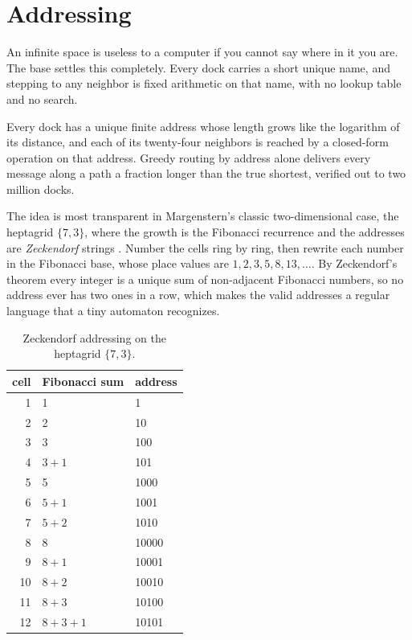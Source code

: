 \section{Addressing}

An infinite space is useless to a computer if you cannot say where in it you are. The base settles this completely. Every dock carries a short unique name, and stepping to any neighbor is fixed arithmetic on that name, with no lookup table and no search.

\begin{result}
Every dock has a unique finite address whose length grows like the logarithm of its distance, and each of its twenty-four neighbors is reached by a closed-form operation on that address. Greedy routing by address alone delivers every message along a path a fraction longer than the true shortest, verified out to two million docks. \cite{pollard2026vibetest}
\end{result}

The idea is most transparent in Margenstern's classic two-dimensional case, the heptagrid $\{7,3\}$, where the growth is the Fibonacci recurrence and the addresses are \emph{Zeckendorf} strings \cite{margenstern2008, margenstern2013}. Number the cells ring by ring, then rewrite each number in the Fibonacci base, whose place values are $1, 2, 3, 5, 8, 13, \ldots$. By Zeckendorf's theorem every integer is a unique sum of non-adjacent Fibonacci numbers, so no address ever has two ones in a row, which makes the valid addresses a regular language that a tiny automaton recognizes.

\begin{table}[ht]
\centering
\begin{tabular}{@{}rll@{}}
\toprule
cell & Fibonacci sum & address \\
\midrule
1  & 1         & 1 \\
2  & 2         & 10 \\
3  & 3         & 100 \\
4  & $3 + 1$     & 101 \\
5  & 5         & 1000 \\
6  & $5 + 1$     & 1001 \\
7  & $5 + 2$     & 1010 \\
8  & 8         & 10000 \\
9  & $8 + 1$     & 10001 \\
10 & $8 + 2$     & 10010 \\
11 & $8 + 3$     & 10100 \\
12 & $8 + 3 + 1$ & 10101 \\
\bottomrule
\end{tabular}
\caption{Zeckendorf addressing on the heptagrid $\{7,3\}$.}
\end{table}

